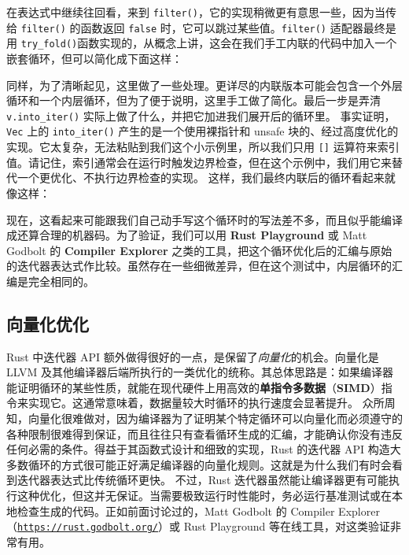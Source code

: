 在表达式中继续往回看，来到 \texttt{filter()}，它的实现稍微更有意思一些，因为当传给 \texttt{filter()} 的函数返回 \texttt{false} 时，它可以跳过某些值。\texttt{filter()} 适配器最终是用 \texttt{try\_fold()}函数实现的，从概念上讲，这会在我们手工内联的代码中加入一个嵌套循环，但可以简化成下面这样：
同样，为了清晰起见，这里做了一些处理。更详尽的内联版本可能会包含一个外层循环和一个内层循环，但为了便于说明，这里手工做了简化。最后一步是弄清 \texttt{v.\allowbreak{}into\_\allowbreak{}iter(\allowbreak{})\allowbreak{}} 实际上做了什么，并把它加进我们展开后的循环里。
\label{idx:idx_0f25231e}
\label{idx:idx_c86482e6}
事实证明，\texttt{Vec} 上的 \texttt{into\_\allowbreak{}iter(\allowbreak{})\allowbreak{}} 产生的是一个使用裸指针和 unsafe 块的、经过高度优化的实现。它太复杂，无法粘贴到我们这个小示例里，所以我们只用 \texttt{[]} 运算符来索引值。请记住，索引通常会在运行时触发边界检查，但在这个示例中，我们用它来替代一个更优化、不执行边界检查的实现。
这样，我们最终内联后的循环看起来就像这样：
现在，这看起来可能跟我们自己动手写这个循环时的写法差不多，而且似乎能编译成还算合理的机器码。为了验证，我们可以用 \textbf{Rust Playground} 或 Matt Godbolt 的 \textbf{Compiler Explorer} 之类的工具，把这个循环优化后的汇编与原始的迭代器表达式作比较。虽然存在一些细微差异，但在这个测试中，内层循环的汇编是完全相同的。
\subsection{向量化优化}
\label{idx:idx_04dbbc57}
\label{idx:idx_031e1d31}
\label{idx:idx_c1e4d90f}
\label{idx:idx_4b0cff68}
Rust 中迭代器 API 额外做得很好的一点，是保留了\emph{向量化}的机会。向量化是 LLVM 及其他编译器后端所执行的一类优化的统称。其总体思路是：如果编译器能证明循环的某些性质，就能在现代硬件上用高效的\textbf{单指令多数据}（\textbf{SIMD}）指令来实现它。这通常意味着，数据量较大时循环的执行速度会显著提升。
众所周知，向量化很难做对，因为编译器为了证明某个特定循环可以向量化而必须遵守的各种限制很难得到保证，而且往往只有查看循环生成的汇编，才能确认你没有违反任何必需的条件。得益于其函数式设计和细致的实现，Rust 的迭代器 API 构造大多数循环的方式很可能正好满足编译器的向量化规则。这就是为什么我们有时会看到迭代器表达式比传统循环更快。
\label{idx:idx_288b3c01}
不过，Rust 迭代器虽然能让编译器更有可能执行这种优化，但这并无保证。当需要极致运行时性能时，务必运行基准测试或在本地检查生成的代码。正如前面讨论过的，Matt Godbolt 的 Compiler Explorer（\href{https://rust.godbolt.org/}{\texttt{https:/\allowbreak{}/\allowbreak{}rust.\allowbreak{}godbolt.\allowbreak{}org/\allowbreak{}}}）或 Rust Playground 等在线工具，对这类验证非常有用。
